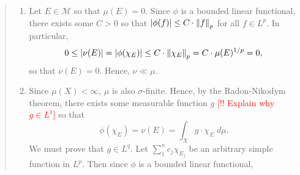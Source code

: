\documentclass{article}
\begin{document}
\begin{itemize}
\begin{quote}
\begin{solutions}
\begin{enumerate}[itemsep =-2pt,label = (\arabic{*})]
\begin{equation}
				\end{equation}
				For each positive integer $n > 0$, define the sum 
				\begin{equation}
					S_{n} = \sum_{1}^{n}\chi_{E_{j}} = \chi_{\bigcup_{1}^{n}E_{j}}. 
				\end{equation}
				We observe that 
				\begin{align}
					\begin{split}
						\norm{\chi_{\bigcup^{\infty}E_{j}} - S_{n}}_{p} &=  \norm{ \sum_{j > n}\chi_{E_{j}} }_{p} \\
						&= \left(\sum_{j > n}\mu(E_{j})\right)^{1/p}. 
					\end{split}
				\end{align}
				We know that since $\mu$ is finite, $\sum_{1}^{\infty}\mu(E_{j})$ converges. And therefore, the tail of this sum must decay. Hence, 
				\begin{equation}
					\sum_{j > n}\mu(E_{j}) \longrightarrow 0 \text{ as $n \to \infty$}, 
				\end{equation}
				which proves that $S_{n} \to \chi_{\bigcup^{\infty}E_{j}}$ in the $L^{p}$-norm. Since $\phi$ is continuous, we conclude that 
				\begin{equation}
					\sum_{1}^{\infty}\nu(E_{j}) \longleftarrow \sum_{1}^{n}\nu(E_{j}) = \nu\left(\bigcup_{1}^{n}E_{j}\right) = \phi\left(\chi_{S_{n}}\right) \longrightarrow \phi(\chi_{\bigcup^{\infty}E_{j}}) = \nu\left(\bigcup_{1}^{\infty}E_{j}\right).
				\end{equation}
				Hence, this concludes the proof that $\nu$ is a complex measure.
				\item Let $E \in \mathscr{M}$ so that $\mu(E) = 0$. Since $\phi$ is a bounded linear functional, there exists some $C > 0$ so that $|\phi(f)| \leq C\cdot \left\Vert f \right\Vert_{p}$ for all $f \in L^{p}$. In particular, 
				\begin{equation}
					0 \leq |\nu(E)| = |\phi(\chi_{E})| \leq C \cdot \left\Vert \chi_{E} \right\Vert_{p} = C \cdot \mu(E)^{1/p} = 0,
				\end{equation}
				so that $\nu(E) = 0$. Hence, $\nu \ll \mu$. 
				\item Since $\mu(X) < \infty$, $\mu$ is also $\sigma$-finite. Hence, by the Radon-Nikodym theorem, there exists some measurable function $g$ \textcolor{red}{[!! Explain why $g \in L^{1}$]} so that 
				\begin{equation}
					\phi(\chi_{E}) = \nu(E) =\int_{X}g\cdot \chi_{E}\;d\mu. 
				\end{equation}
				We must prove that $g \in L^{q}$. Let $\sum_{1}^{n}c_{j}\chi_{E_{j}}$ be an arbitrary simple function in $L^{p}$. Then since $\phi$ is a bounded linear functional, 

\end{enumerate}
\end{solutions}
\end{quote}
\end{itemize}
\end{document}
